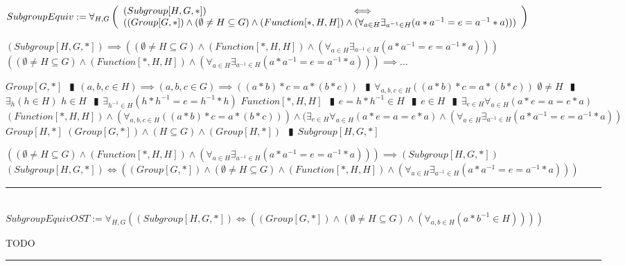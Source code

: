 \documentclass{book}
\newcommand{\abr}{:=}
\newcommand{\pipe}{$\phantom{(}\vrectangleblack\phantom{)}$}
\begin{document}
$SubgroupEquiv \abr \forall_{H, G}\left(\begin{array}{ll}
  (Subgroup[H, G, *]) \hfill \iff \hfill \\
  ((Group[G, *]) \land (\emptyset \neq H \subseteq G) \land (Function[*, H, H]) \land (\forall_{a \in H} \exists_{a^{-1} \in H}(a * a^{-1} = e = a^{-1} * a)))
\end{array}\right)$
\begin{enumerate}
  \lit $(Subgroup[H, G, *]) \implies ((\emptyset \neq H \subseteq G) \land (Function[*, H, H]) \land (\forall_{a \in H} \exists_{a^{-1} \in H}(a * a^{-1} = e = a^{-1} * a)))$
  \lit $((\emptyset \neq H \subseteq G) \land (Function[*, H, H]) \land (\forall_{a \in H} \exists_{a^{-1} \in H}(a * a^{-1} = e = a^{-1} * a))) \implies \ldots$
  \begin{enumerate}
    \lit $Group[G, *]$ \pipe $(a, b, c \in H) \implies (a, b, c \in G) \implies ((a * b) * c = a * (b * c))$ \pipe $\forall_{a, b, c \in H}((a * b) * c = a * (b * c))$
    \lit $\emptyset \neq H$ \pipe $\exists_{h}(h \in H)$
    \lit $h \in H$ \pipe $\exists_{h^{-1} \in H}(h * h^{-1} = e = h^{-1} * h)$
    \lit $Function[*, H, H]$ \pipe $e = h * h^{-1} \in H$ \pipe $e \in H$ \pipe $\exists_{e \in H} \forall_{a \in H}(a * e = a = e * a)$
    \lit $(Function[*, H, H]) \land (\forall_{a, b, c \in H}((a * b) * c = a * (b * c))) \land (\exists_{e \in H} \forall_{a \in H}(a * e = a = e * a) \land (\forall_{a \in H} \exists_{a^{-1} \in H}(a * a^{-1} = e = a^{-1} * a))$
    \lit $Group[H, *]$
    \lit $(Group[G, *]) \land (H \subseteq G) \land (Group[H, *])$ \pipe $Subgroup[H, G, *]$
  \end{enumerate}
  \lit $((\emptyset \neq H \subseteq G) \land (Function[*, H, H]) \land (\forall_{a \in H} \exists_{a^{-1} \in H}(a * a^{-1} = e = a^{-1} * a))) \implies (Subgroup[H, G, *])$
  \lit $(Subgroup[H, G, *]) \iff ((Group[G, *]) \land (\emptyset \neq H \subseteq G) \land (Function[*, H, H]) \land (\forall_{a \in H} \exists_{a^{-1} \in H}(a * a^{-1} = e = a^{-1} * a)))$
\end{enumerate} \vspace{.75mm} \hrule \vspace{.75mm} \ \\ 

$SubgroupEquivOST \abr \forall_{H, G}((Subgroup[H, G, *]) \iff ((Group[G, *]) \land (\emptyset \neq H \subseteq G) \land (\forall_{a, b \in H}(a * b^{-1} \in H))))$
\begin{enumerate}
  \lit TODO
\end{enumerate} \vspace{.75mm} \hrule \vspace{.75mm} \ \\ 
\end{document}
